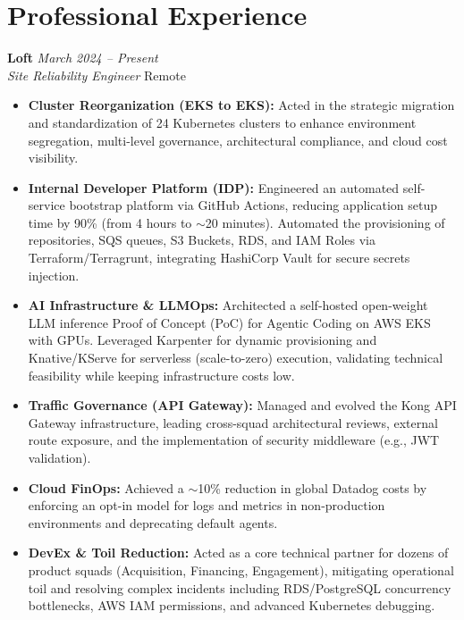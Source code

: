 \documentclass[10pt,a4paper]{article}
\newcommand{\experienceitem}[4]{
  \vspace{4pt}
  {\bfseries\color{textdark}#1} \hfill {\em #2} \\
  {\itshape\color{secondary}#3} \hfill {\small\color{gray}#4} \\[2pt]
}
\begin{document}
\section*{Professional Experience}

\experienceitem{Loft}{March 2024 -- Present}{Site Reliability Engineer}{Remote}
\begin{itemize}[leftmargin=*, noitemsep, topsep=2pt]
    \item \textbf{Cluster Reorganization (EKS to EKS):} Acted in the strategic migration and standardization of 24 Kubernetes clusters to enhance environment segregation, multi-level governance, architectural compliance, and cloud cost visibility.
    \item \textbf{Internal Developer Platform (IDP):} Engineered an automated self-service bootstrap platform via GitHub Actions, reducing application setup time by 90\% (from 4 hours to $\sim$20 minutes). Automated the provisioning of repositories, SQS queues, S3 Buckets, RDS, and IAM Roles via Terraform/Terragrunt, integrating HashiCorp Vault for secure secrets injection.
    \item \textbf{AI Infrastructure \& LLMOps:} Architected a self-hosted open-weight LLM inference Proof of Concept (PoC) for Agentic Coding on AWS EKS with GPUs. Leveraged Karpenter for dynamic provisioning and Knative/KServe for serverless (scale-to-zero) execution, validating technical feasibility while keeping infrastructure costs low.
    \item \textbf{Traffic Governance (API Gateway):} Managed and evolved the Kong API Gateway infrastructure, leading cross-squad architectural reviews, external route exposure, and the implementation of security middleware (e.g., JWT validation).
    \item \textbf{Cloud FinOps:} Achieved a $\sim$10\% reduction in global Datadog costs by enforcing an opt-in model for logs and metrics in non-production environments and deprecating default agents.
    \item \textbf{DevEx \& Toil Reduction:} Acted as a core technical partner for dozens of product squads (Acquisition, Financing, Engagement), mitigating operational toil and resolving complex incidents including RDS/PostgreSQL concurrency bottlenecks, AWS IAM permissions, and advanced Kubernetes debugging.
\end{itemize}
\end{document}
